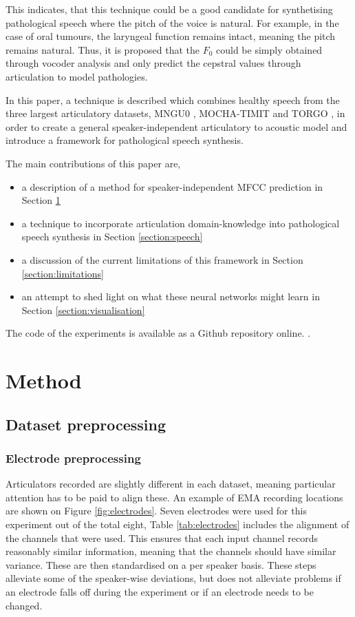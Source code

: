 \documentclass[a4paper]{article}
\begin{document}
This indicates, that this technique could be a good candidate for synthetising
pathological speech where the pitch of the voice is natural. For example,
in the case of oral tumours, the laryngeal function remains intact,
meaning the pitch remains natural. Thus, it is proposed that the \( F_0 \) could
be simply obtained through vocoder analysis and only predict the cepstral
values through articulation to model pathologies.

In this paper, a technique is described which combines healthy speech
from the three largest articulatory datasets, MNGU0 \cite{Richmond2011},
MOCHA-TIMIT \cite{Wrench1999} and TORGO \cite{Rudzicz2012}, in order to
create a general speaker-independent articulatory to acoustic model and
introduce a framework for pathological speech synthesis.

\noindent The main contributions of this paper are,
\begin{itemize}
\setlength\itemsep{-0.3em}
\item a description of a method for speaker-independent MFCC prediction in Section \ref{section:method}
\item a technique to incorporate articulation domain-knowledge into pathological
  speech synthesis in Section \ref{section:speech} 
\item a discussion of the current limitations of this framework in Section \ref{section:limitations}
\item an attempt to shed light on what these neural networks might learn in Section \ref{section:visualisation}
\end{itemize}

\noindent The code of the experiments is available as a Github repository online.
\cite{Halpern2019}.

\section{Method} \label{section:method}
\subsection{Dataset preprocessing}

\subsubsection{Electrode preprocessing}

Articulators recorded are slightly different in each dataset, meaning particular attention has to be paid to align these. An example of EMA recording locations are shown on Figure \ref{fig:electrodes}. Seven electrodes were used for this experiment out of the total eight, Table \ref{tab:electrodes} includes
the alignment of the channels that were used. This ensures that each
input channel records reasonably similar information, meaning that the
channels should have similar variance. These are then standardised on a per speaker
basis. These steps alleviate some
of the speaker-wise deviations, but does not alleviate problems if an electrode
falls off during the experiment or if an electrode needs to be changed.
\end{document}
